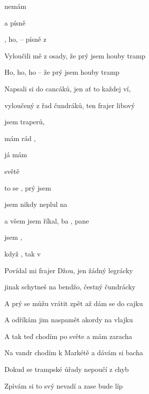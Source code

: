 

\zs
{} nemám 

a  písně 

, ho,  --  písně z  
\ks

\zs
Vyloučili mě z osady, že prý jsem houby tramp

Ho, ho, ho -- že prý jsem houby tramp

Napsali si do cancáků, jen ať to každej ví,

vyloučený z řad čundráků, ten frajer libový
\ks

\zr
{} jsem  traperů, 

 mám rád ,

já mám  

  světě 

to  se ,  prý jsem 

 jsem nikdy neplul na 

a všem  jsem říkal, ba , pane

 jsem  ,

 když , tak v    
\kr

\zs
Povídal mi frajer Džou, jen žádný legrácky

jinak schytneš na bendžo, čestný čundrácky

A prý se můžu vrátit zpět až dám se do cajku

A odříkám jim naspamět akordy na vlajku
\ks

\zs
A tak teď chodím po světe a mám zaracha

Na vandr chodím k Markétě a dávám si bacha

Dokud se trampské úřady nepoučí z chyb

Zpívám si to svý nevadí a zase bude líp
\ks

\kp





